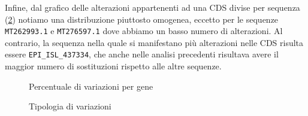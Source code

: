 \documentclass[11pt,italian]{article}
\begin{document}
Infine, dal grafico delle alterazioni appartenenti ad una CDS divise per sequenza (\cref{fig:plot-per-sequence}) notiamo una distribuzione piuttosto omogenea, eccetto per le sequenze \lstinline{MT262993.1} e \lstinline{MT276597.1} dove abbiamo un basso numero di alterazioni. Al contrario, la sequenza nella quale si manifestano più alterazioni nelle CDS risulta essere \lstinline{EPI_ISL_437334}, che anche nelle analisi precedenti risultava avere il maggior numero di sostituzioni rispetto alle altre sequenze.
\begin{figure}[]
  \caption{Percentuale di variazioni per gene}
  \label{fig:plot-alterations-per-gene}
\end{figure}

\begin{figure}[H]
  \caption{Tipologia di variazioni}
  \label{fig:plot-per-sequence}
\end{figure}
\end{document}
